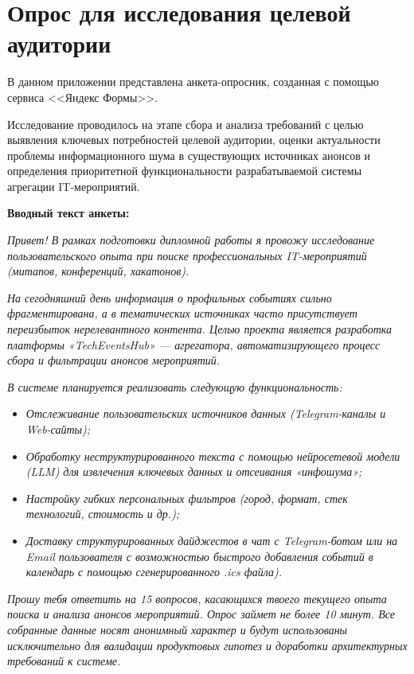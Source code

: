 \chapter{Опрос для исследования целевой аудитории}
\label{app:target-audience-survey}

В данном приложении представлена анкета-опросник, созданная с помощью сервиса <<Яндекс Формы>>.

Исследование проводилось на этапе сбора и анализа требований с целью выявления ключевых потребностей целевой аудитории, оценки актуальности проблемы информационного шума в существующих источниках анонсов и определения приоритетной функциональности разрабатываемой системы агрегации IT-мероприятий. 

\vspace{1em}
\noindent\textbf{Вводный текст анкеты:}
\vspace{1em}

\textit{Привет! В рамках подготовки дипломной работы я провожу исследование пользовательского опыта при поиске профессиональных IT-мероприятий (митапов, конференций, хакатонов).}

\textit{На сегодняшний день информация о профильных событиях сильно фрагментирована, а в тематических источниках часто присутствует переизбыток нерелевантного контента. 
Целью проекта является разработка платформы «TechEventsHub» — агрегатора, автоматизирующего процесс сбора и фильтрации анонсов мероприятий.}

\textit{В системе планируется реализовать следующую функциональность:}
\begin{itemize}
    \item \textit{Отслеживание пользовательских источников данных (Telegram-каналы и Web-сайты);}
    \item \textit{Обработку неструктурированного текста с помощью нейросетевой модели (LLM) для извлечения ключевых данных и отсеивания «инфошума»;}
    \item \textit{Настройку гибких персональных фильтров (город, формат, стек технологий, стоимость и др.);}
    \item \textit{Доставку структурированных дайджестов в чат с Telegram-ботом или на Email пользователя с возможностью быстрого добавления событий в календарь с помощью сгенерированного .ics файла).}
\end{itemize}

\textit{Прошу тебя ответить на 15 вопросов, касающихся твоего текущего опыта поиска и анализа анонсов мероприятий. Опрос займет не более 10 минут. 
Все собранные данные носят анонимный характер и будут использованы исключительно для валидации продуктовых гипотез и доработки архитектурных требований к системе.}

